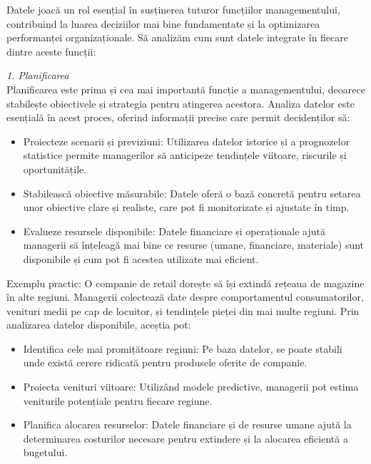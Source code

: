 \documentclass[
  11pt,
  b5paper,
  nottoc]{book}
\providecommand{\tightlist}{%
  \setlength{\itemsep}{0pt}\setlength{\parskip}{0pt}}\usepackage{longtable,booktabs,array}
\begin{document}
Datele joacă un rol esențial în susținerea tuturor funcțiilor
managementului, contribuind la luarea deciziilor mai bine fundamentate
și la optimizarea performanței organizaționale. Să analizăm cum sunt
datele integrate în fiecare dintre aceste funcții:

\emph{1. Planificarea}\\
Planificarea este prima și cea mai importantă funcție a managementului,
deoarece stabilește obiectivele și strategia pentru atingerea acestora.
Analiza datelor este esențială în acest proces, oferind informații
precise care permit decidenților să:

\begin{itemize}
\tightlist
\item
  Proiecteze scenarii și previziuni: Utilizarea datelor istorice și a
  prognozelor statistice permite managerilor să anticipeze tendințele
  viitoare, riscurile și oportunitățile.\\
\item
  Stabilească obiective măsurabile: Datele oferă o bază concretă pentru
  setarea unor obiective clare și realiste, care pot fi monitorizate și
  ajustate în timp.\\
\item
  Evalueze resursele disponibile: Datele financiare și operaționale
  ajută managerii să înțeleagă mai bine ce resurse (umane, financiare,
  materiale) sunt disponibile și cum pot fi acestea utilizate mai
  eficient.
\end{itemize}

Exemplu practic: O companie de retail dorește să își extindă rețeaua de
magazine în alte regiuni. Managerii colectează date despre
comportamentul consumatorilor, venituri medii pe cap de locuitor, și
tendințele pieței din mai multe regiuni. Prin analizarea datelor
disponibile, aceștia pot:

\begin{itemize}
\tightlist
\item
  Identifica cele mai promițătoare regiuni: Pe baza datelor, se poate
  stabili unde există cerere ridicată pentru produsele oferite de
  companie.\\
\item
  Proiecta venituri viitoare: Utilizând modele predictive, managerii pot
  estima veniturile potențiale pentru fiecare regiune.\\
\item
  Planifica alocarea resurselor: Datele financiare și de resurse umane
  ajută la determinarea costurilor necesare pentru extindere și la
  alocarea eficientă a bugetului.
\end{itemize}
\end{document}
